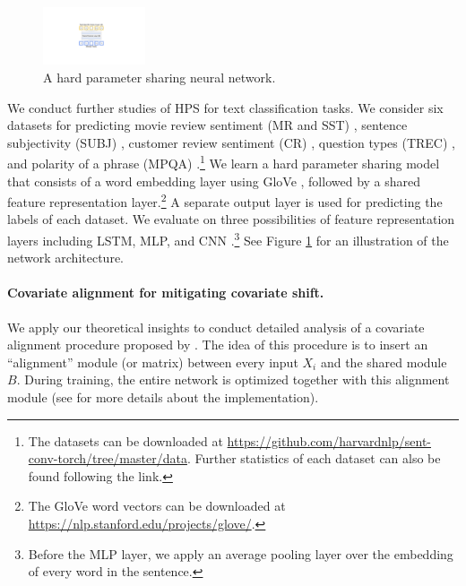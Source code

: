 \begin{figure}
	\vspace{-0.35in}
	\begin{center}
		\includegraphics[width=0.27\textwidth]{figures/mtl_model_arch.pdf}
	\end{center}
	\vspace{-0.28in}
	\caption{A hard parameter sharing neural network.}
	\label{fig_intro_arch}
\end{figure}
We conduct further studies of HPS for text classification tasks.
We consider six datasets for predicting movie review sentiment (MR and SST) \cite{pang2005seeing,socher2013recursive}, sentence subjectivity (SUBJ) \cite{pang2004sentimental}, customer review sentiment (CR) \cite{hu2004mining}, question types (TREC) \cite{li2002learning}, and polarity of a phrase (MPQA) \cite{wiebe2005annotating}.\footnote{The datasets can be downloaded at \url{https://github.com/harvardnlp/sent-conv-torch/tree/master/data}. Further statistics of each dataset can also be found following the link.}
We learn a hard parameter sharing model that consists of a word embedding layer using GloVe \cite{pennington2014glove}, followed by a shared feature representation layer.\footnote{The GloVe word vectors can be downloaded at \url{https://nlp.stanford.edu/projects/glove/}.}
A separate output layer is used for predicting the labels of each dataset.
We evaluate on three possibilities of feature representation layers including LSTM, MLP, and CNN \cite{lei2018simple}.\footnote{Before the MLP layer, we apply an average pooling layer over the embedding of every word in the sentence.}
See Figure \ref{fig_intro_arch} for an illustration of the network architecture.

\paragraph{Covariate alignment for mitigating covariate shift.}
We apply our theoretical insights to conduct detailed analysis of a covariate alignment procedure proposed by \citet{WZR20}.
The idea of this procedure is to insert an ``alignment'' module (or matrix) between every input $X_i$ and the shared module $B$.
During training, the entire network is optimized together with this alignment module (see \citet{WZR20} for more details about the implementation).

